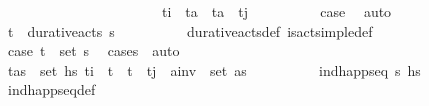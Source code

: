 \begin{isabellebody}
\ \ \ \ \ \ \ \ \ \ \ \ \ \ \ \ \ \ \ \ \ \ \ {\isachardoublequoteopen}t\isactrlsub i{\isacharprime}{\kern0pt}\ {\isacharless}{\kern0pt}\ t\isactrlsub a\ {\isasymand}\ t\isactrlsub a\ {\isacharless}{\kern0pt}\ t\isactrlsub j{\isacharprime}{\kern0pt}{\isachardoublequoteclose}\isanewline
\ \ \ \ \ \ \ \ \isamarkupfalse%
\ {\isacartoucheopen}{\isacharquery}{\kern0pt}case{}{\isacartoucheclose}\ \isamarkupfalse%
\ auto\isanewline
\ \ \ \ \ \ \isamarkupfalse%
\ {\isachardoublequoteopen}{\isacharparenleft}{\kern0pt}t\isactrlsub {\isasympi}{\isacharcomma}{\kern0pt}{\isasympi}{\isacharparenright}{\kern0pt}\ {\isasymin}\ durative{\isacharunderscore}{\kern0pt}acts\ {\isasympi}s{\isachardoublequoteclose}\isanewline
\ \ \ \ \ \ \ \ \isamarkupfalse%
\ durative{\isacharunderscore}{\kern0pt}acts{\isacharunderscore}{\kern0pt}def\ is{\isacharunderscore}{\kern0pt}act{\isacharunderscore}{\kern0pt}simple{\isacharunderscore}{\kern0pt}def\isanewline
\ \ \ \ \ \ \ \ \isamarkupfalse%
\ {\isacartoucheopen}{\isacharquery}{\kern0pt}case{}{\isacartoucheclose}\ {\isacartoucheopen}{\isacharparenleft}{\kern0pt}t\isactrlsub {\isasympi}{\isacharcomma}{\kern0pt}{\isasympi}{\isacharparenright}{\kern0pt}\ {\isasymin}\ set\ {\isasympi}s{\isacartoucheclose}\ \isamarkupfalse%
\ {\isacharparenleft}{\kern0pt}cases\ {\isasympi}{\isacharparenright}{\kern0pt}\ auto\isanewline
\ \ \ \ \ \ \isanewline
\ \ \ \ \ \ \isamarkupfalse%
\ \isamarkupfalse%
\ {\isachardoublequoteopen}{\isasymexists}{\isacharparenleft}{\kern0pt}t{\isacharprime}{\kern0pt}{\isacharcomma}{\kern0pt}as{\isacharparenright}{\kern0pt}\ {\isasymin}\ set\ hs\ t\isactrlsub i{\isacharprime}{\kern0pt}\ {\isacharless}{\kern0pt}\ t{\isacharprime}{\kern0pt}\ {\isasymand}\ t{\isacharprime}{\kern0pt}\ {\isacharless}{\kern0pt}\ t\isactrlsub j{\isacharprime}{\kern0pt}\ {\isasymand}\ {\isacharquery}{\kern0pt}a\isactrlsub i\isactrlsub n\isactrlsub v\ {\isasymin}\ set\ as{\isachardoublequoteclose}\isanewline
\ \ \ \ \ \ \ \ \isamarkupfalse%
\ {\isacartoucheopen}ind{\isacharunderscore}{\kern0pt}happ{\isacharunderscore}{\kern0pt}seq\ {\isasympi}s\ hs\ \isamarkupfalse%
\ ind{\isacharunderscore}{\kern0pt}happ{\isacharunderscore}{\kern0pt}seq{\isacharunderscore}{\kern0pt}def\isanewline
\ \ \ \ \ \ \ \ \isamarkupfalse%

\end{isabellebody}
